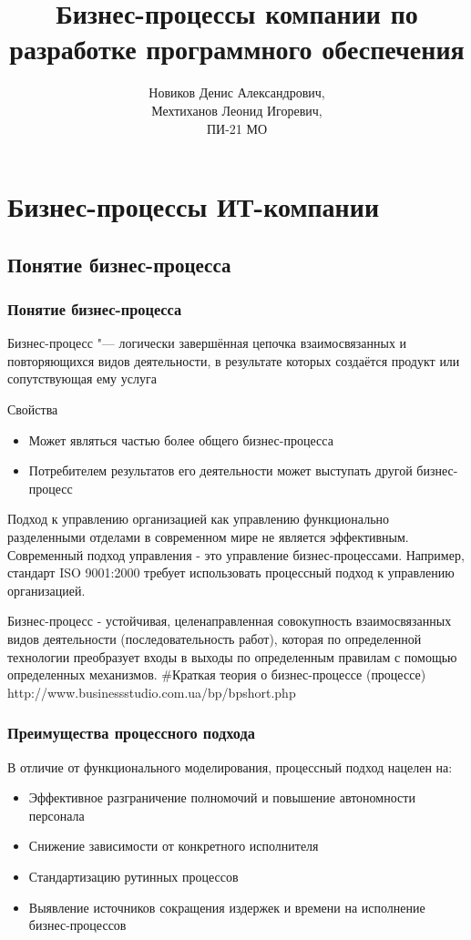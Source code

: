 \documentclass{../industrial-development}
\title{Бизнес-процессы компании по разработке программного обеспечения}
\author{Новиков Денис Александрович, \\Мехтиханов Леонид Игоревич, \\ПИ-21 МО}
\date{}
\begin{document}
\begin{frame}
  \titlepage
\end{frame}


\section{Бизнес-процессы ИТ-компании}

\subsection{Понятие бизнес-процесса}


\begin{frame} \frametitle{Понятие бизнес-процесса}
	\begin{block}{}
		\alert{Бизнес-процесс} "--- логически завершённая цепочка взаимосвязанных и повторяющихся видов деятельности, в результате которых создаётся продукт или сопутствующая ему услуга
	\end{block}
	\begin{block}{Свойства}
		\begin{itemize}
			\item Может являться частью более общего бизнес-процесса
			\item Потребителем результатов его деятельности может выступать другой бизнес-процесс
		\end{itemize}
	\end{block}
\end{frame}
\lecturenotes
Подход к управлению организацией как управлению функционально разделенными отделами в современном мире не является эффективным. 
Современный подход управления - это управление бизнес-процессами.
Например, стандарт ISO 9001:2000 требует использовать процессный подход к управлению организацией.

Бизнес-процесс - устойчивая, целенаправленная совокупность взаимосвязанных видов деятельности (последовательность работ), которая по определенной технологии преобразует входы в выходы по определенным правилам с помощью определенных механизмов. 
#Краткая теория о бизнес-процессе (процессе) http://www.businessstudio.com.ua/bp/bpshort.php


\begin{frame} \frametitle{Преимущества процессного подхода}
	В отличие от функционального моделирования, процессный подход нацелен на:
	\begin{itemize}
		\item Эффективное разграничение полномочий и повышение автономности персонала
		\item Снижение зависимости от конкретного исполнителя
		\item Стандартизацию рутинных процессов
		\item Выявление источников сокращения издержек и времени на исполнение бизнес-процессов
	\end{itemize}
\end{frame}
\lecturenotes
\end{document}
